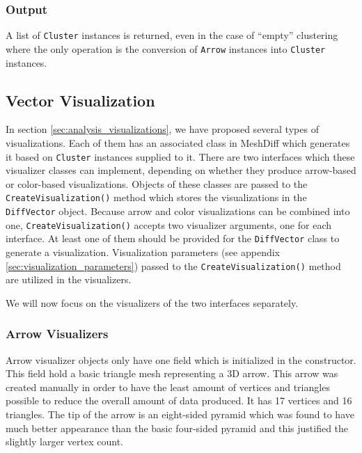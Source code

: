 \subsubsection{Output}

A list of \verb+Cluster+ instances is returned, even in the case of ``empty'' clustering where the only operation is the conversion of \verb+Arrow+ instances into \verb+Cluster+ instances.

\subsection{Vector Visualization}
\label{sec:implementation_visualizers}

In section \ref{sec:analysis_visualizations}, we have proposed several types of visualizations. Each of them has an associated class in MeshDiff which generates it based on \verb+Cluster+ instances supplied to it. There are two interfaces which these visualizer classes can implement, depending on whether they produce arrow-based or color-based visualizations. Objects of these classes are passed to the \verb+CreateVisualization()+ method which stores the visualizations in the \verb+DiffVector+ object. Because arrow and color visualizations can be combined into one, \verb+CreateVisualization()+ accepts two visualizer arguments, one for each interface. At least one of them should be provided for the \verb+DiffVector+ class to generate a visualization. Visualization parameters (see appendix \ref{sec:visualization_parameters}) passed to the \verb+CreateVisualization()+ method are utilized in the visualizers.

We will now focus on the visualizers of the two interfaces separately.

\subsubsection{Arrow Visualizers}

Arrow visualizer objects only have one field which is initialized in the constructor. This field hold a basic triangle mesh representing a 3D arrow. This arrow was created manually in order to have the least amount of vertices and triangles possible to reduce the overall amount of data produced. It has 17 vertices and 16 triangles. The tip of the arrow is an eight-sided pyramid which was found to have much better appearance than the basic four-sided pyramid and this justified the slightly larger vertex count.


